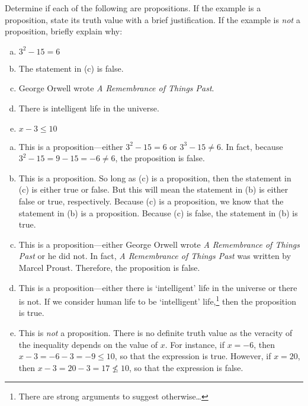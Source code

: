 \documentclass[11pt,letterpaper]{article}
\begin{document}

 Determine if each of the following are propositions. If the example is a proposition, state its truth value with a brief justification. If the example is \textit{not} a proposition, briefly explain why:
	\begin{enumerate}[(a)]
	\item $3^2 - 15= 6$
	\item The statement in (c) is false. 
	\item George Orwell wrote \textit{A Remembrance of Things Past}. 
	\item There is intelligent life in the universe.  
	\item $x - 3 \leq 10$
	\end{enumerate} \pspace

\sol 
\begin{enumerate}[(a)]
\item This is a proposition---either $3^2 - 15= 6$ or $3^3 - 15 \neq 6$. In fact, because $3^2 - 15= 9 - 15= -6 \neq 6$, the proposition is false. \pspace

\item This is a proposition. So long as (c) is a proposition, then the statement in (c) is either true or false. But this will mean the statement in (b) is either false or true, respectively. Because (c) is a proposition, we know that the statement in (b) is a proposition. Because (c) is false, the statement in (b) is true. \pspace

\item This is a proposition---either George Orwell wrote \textit{A Remembrance of Things Past} or he did not. In fact, \textit{A Remembrance of Things Past} was written by Marcel Proust. Therefore, the proposition is false. \pspace

\item This is a proposition---either there is `intelligent' life in the universe or there is not. If we consider human life to be `intelligent' life,\footnote{There are strong arguments to suggest otherwise\dots} then the proposition is true. \pspace

\item This is \textit{not} a proposition. There is no definite truth value as the veracity of the inequality depends on the value of $x$. For instance, if $x= -6$, then $x - 3= -6 - 3= -9 \leq 10$, so that the expression is true. However, if $x= 20$, then $x - 3= 20 - 3= 17 \not\leq 10$, so that the expression is false. 
\end{enumerate}
\end{document}
